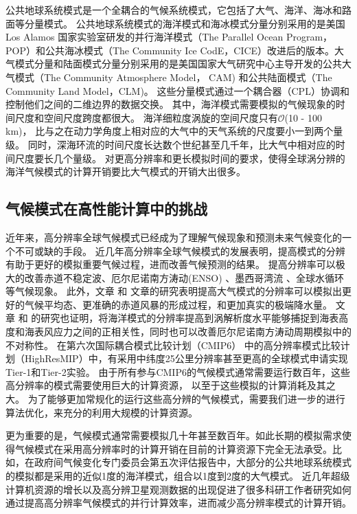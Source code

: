 公共地球系统模式是一个全耦合的气候系统模式，它包括了大气、海洋、海冰和路面等分量模式。
公共地球系统模式的海洋模式和海冰模式分量分别采用的是美国Los Alamos 国家实验室研发的并行海洋模式（The Parallel Ocean Program，POP）和公共海冰模式（The Community Ice CodE，CICE）改进后的版本。大气模式分量和陆面模式分量分别采用的是美国国家大气研究中心主导开发的公共大气模式（The Community Atmosphere Model， CAM) 和公共陆面模式（The Community Land Model，CLM)。 这些分量模式通过一个耦合器（CPL）协调和控制他们之间的二维边界的数据交换。
其中，海洋模式需要模拟的气候现象的时间尺度和空间尺度跨度都很大。 
海洋细粒度涡旋的空间尺度只有$\mathcal{O}$(10 - 100 km)， 比与之在动力学角度上相对应的大气中的天气系统的尺度要小一到两个量级。
同时，深海环流的时间尺度长达数个世纪甚至几千年，比大气中相对应的时间尺度要长几个量级。
对更高分辨率和更长模拟时间的要求，使得全球涡分辨的海洋气候模式的计算开销要比大气模式的开销大出很多\cite{bryan2010frontal,mcclean2011prototype,graham2014importance}。
 


 

\subsection{气候模式在高性能计算中的挑战}

近年来，高分辨率全球气候模式已经成为了理解气候现象和预测未来气候变化的一个不可或缺的手段。
近几年高分辨率全球气候模式的发展表明，提高模式的分辨有助于更好的模拟重要气候过程，进而改善气候预测的结果。
提高分辨率可以极大的改善赤道不稳定波\citep{roberts2009impact}、厄尔尼诺南方涛动(ENSO) \citep{shaffrey2009uk}、墨西哥湾流\citep{chassignet2008gulf, kuwano2010precipitation} 、全球水循环\citep{demory2014role}等气候现象。
此外，文章 和 文章的研究表明提高大气模式的分辨率可以模拟出更好的气候平均态、更准确的赤道风暴的形成过程，和更加真实的极端降水量。
文章 和 的研究也证明，将海洋模式的分辨率提高到涡解析度水平能够捕捉到海表高度和海表风应力之间的正相关性，同时也可以改善厄尔尼诺南方涛动周期模拟中的不对称性。
在第六次国际耦合模式比较计划（CMIP6） 中的高分辨率模式比较计划（HighResMIP）中，有采用中纬度25公里分辨率甚至更高的全球模式申请实现Tier-1和Tier-2实验。 
由于所有参与CMIP6的气候模式通常需要运行数百年，这些高分辨率的模式需要使用巨大的计算资源， 以至于这些模拟的计算消耗及其之大。
为了能够更加常规化的运行这些高分辨的气候模式，需要我们进一步的进行算法优化，来充分的利用大规模的计算资源。

更为重要的是，气候模式通常需要模拟几十年甚至数百年。如此长期的模拟需求使得气候模式在采用高分辨率时的计算开销在目前的计算资源下完全无法承受。比如，在政府间气候变化专门委员会第五次评估报告中，大部分的公共地球系统模式的模拟都是采用的近似1度的海洋模式，组合以1度到2度的大气模式。
近几年超级计算机资源的增长以及高分辨卫星观测数据的出现促进了很多科研工作者研究如何通过提高高分辨率气候模式的并行计算效率，进而减少高分辨率模式的计算开销。



